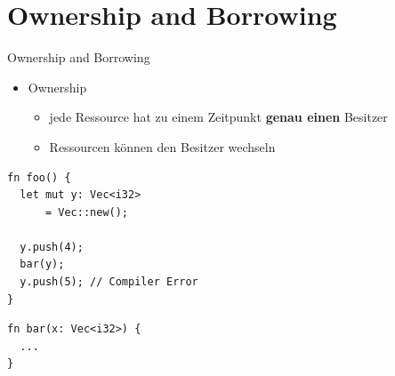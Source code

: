 \documentclass{beamer}
\begin{document}
\section{Ownership and Borrowing}

\begin{frame}[fragile]{Ownership and Borrowing}
	\begin{itemize}
	\pause
	    \item Ownership
	    \begin{itemize}
	        \item jede Ressource hat zu einem Zeitpunkt \textbf{genau einen} Besitzer
	        \item Ressourcen können den Besitzer wechseln
	        \pause
	    \end{itemize}    
	\end{itemize}
\begin{center}
\hspace{3pt}
\begin{minipage}[t]{.47\textwidth}
\begin{lstlisting}
fn foo() {	
  let mut y: Vec<i32> 
      = Vec::new();
		
  y.push(4);	
  bar(y);	
  y.push(5); // Compiler Error	
}
\end{lstlisting}				
\end{minipage}
\hspace{3pt}
\begin{minipage}[t]{.47\textwidth}
\begin{lstlisting}
fn bar(x: Vec<i32>) {	
  ...
}
\end{lstlisting}				
\end{minipage}
\end{center}
\end{frame}
\end{document}
